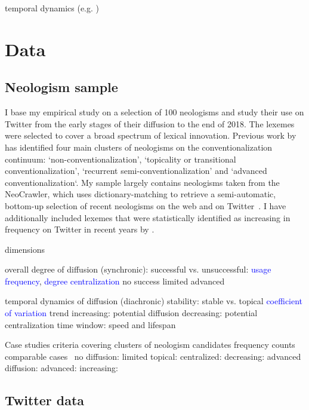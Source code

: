 \documentclass[draft, a4paper, abstract=on]{scrartcl}
\newcommand{\mtrc}[1]{\textcolor{blue}{#1}}
\begin{document}
  temporal dynamics (e.g. )


\section{Data}

  \subsection{Neologism sample}

    I base my empirical study on a selection of 100 neologisms and study their use on Twitter from the early stages of their diffusion to the end of 2018. The lexemes were selected to cover a broad spectrum of lexical innovation. Previous work by \textcite[115--147]{Kerremans2015WebNew} has identified four main clusters of neologisms on the conventionalization continuum: `non-conventionalization', `topicality or transitional conventionalization', `recurrent semi-conventionalization' and `advanced conventionalization`. My sample largely contains neologisms taken from the NeoCrawler, which uses dictionary-matching to retrieve a semi-automatic, bottom-up selection of recent neologisms on the web and on Twitter~\parencite{Kerremans2019UsingDatamining}. I have additionally included lexemes that were statistically identified as increasing in frequency on Twitter in recent years by \textcite{Grieve2016AnalyzingLexical}.



  dimensions

    overall degree of diffusion (synchronic): successful vs. unsuccessful: \mtrc{usage frequency}, \mtrc{degree centralization}
      no success
      limited
      advanced

    temporal dynamics of diffusion (diachronic)
      stability: stable vs. topical \mtrc{coefficient of variation}
      trend
      increasing: potential diffusion
      decreasing: potential centralization
      time window: speed and lifespan

    Case studies
      criteria
      covering clusters of neologism candidates
      frequency counts comparable
      cases~\parencite{Kerremans2015WebNew}
      no diffusion: 
      limited
      topical: 
      centralized: 
      decreasing: 
      advanced diffusion:
      advanced: 
      increasing: 



  \subsection{Twitter data}
\end{document}

